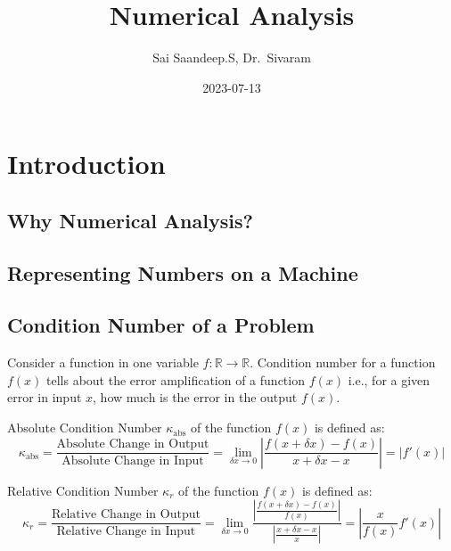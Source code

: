 \documentclass[
]{book}
\title{Numerical Analysis}
\author{Sai Saandeep.S, Dr.~Sivaram}
\date{2023-07-13}
\begin{document}
\maketitle

{
\setcounter{tocdepth}{1}
\tableofcontents
}
\hypertarget{introduction}{%
\chapter{Introduction}\label{introduction}}

\hypertarget{why-numerical-analysis}{%
\section{Why Numerical Analysis?}\label{why-numerical-analysis}}

\hypertarget{representing-numbers-on-a-machine}{%
\section{Representing Numbers on a Machine}\label{representing-numbers-on-a-machine}}

\hypertarget{condition-number-of-a-problem}{%
\section{Condition Number of a Problem}\label{condition-number-of-a-problem}}

Consider a function in one variable \(f:\mathbb{R}\to\mathbb{R}\).
Condition number for a function \(f(x)\) tells about the error amplification of a function \(f(x)\) i.e., for a given error in input \(x\), how much is the error in the output \(f(x)\).

Absolute Condition Number \(\kappa_{\text{abs}}\) of the function \(f(x)\) is defined as:
\begin{equation}
\kappa_{\text{abs}} = \frac{\text{Absolute Change in Output}}{\text{Absolute Change in Input}} = \lim_{\delta x \to 0} \left\lvert{\frac{f(x+\delta x)-f(x)}{x+\delta x - x}}\right\rvert = \left\lvert{f'(x)}\right\rvert
\end{equation}

Relative Condition Number \(\kappa_{r}\) of the function \(f(x)\) is defined as:
\begin{equation}
\kappa_{r} = \frac{\text{Relative Change in Output}}{\text{Relative Change in Input}} = \lim_{\delta x \to 0} \frac{\left\lvert{\frac{f(x+\delta x)-f(x)}{f(x)}}\right\rvert}{\left\lvert{\frac{x+\delta x - x}{x}}\right\rvert} = \left\lvert{\frac{x}{f(x)}f'(x)}\right\rvert
\end{equation}
\end{document}
